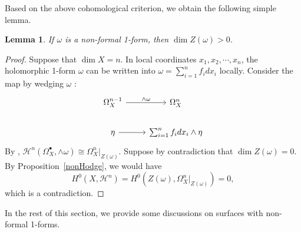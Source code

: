 \documentclass[a4paper,12pt,reqno]{amsart}
\newtheorem{lemma}[theorem]{Lemma}
\theoremstyle{question}
\theoremstyle{definition}
\theoremstyle{remark}
\theoremstyle{cited}
\theoremstyle{citeddef}
\def\cH{\mathcal{H}}
\begin{document}
Based on the above cohomological criterion, we obtain the following simple lemma.
\begin{lemma}\label{lem:positivedim}
    If $\omega$ is a non-formal 1-form, then $\dim Z(\omega)>0$.
\end{lemma}
\begin{proof}
     Suppose that $\dim X=n$. In local coordinates $x_1,x_2,\cdots,x_n$, the holomorphic 1-form $\omega$ can be written into $\omega=\sum_{i=1}^{n}f_idx_i$ locally. Consider the map by wedging $\omega$ :
$$
\begin{tikzcd}
\Omega_{X}^{n-1} \arrow[r,"\wedge \omega"] & \Omega_{X}^{n} \\
\eta \arrow[r]                 & \sum_{i=1}^{n}f_idx_i\wedge\eta
\end{tikzcd}
$$
By \cite[Lemma~4.2]{Sch21}, $\cH^n(\Omega_X^{\bullet},\wedge\omega)\cong \Omega_X^n|_{Z(\omega)}$. Suppose by contradiction that $\dim Z(\omega)=0$. By Proposition~\ref{nonHodge}, we would have 
$$
H^0(X, \cH^n)=H^0(Z(\omega), \Omega_X^n|_{Z(\omega)})=0,
$$
which is a contradiction.
\end{proof}
 

In the rest of this section, we provide some discussions on surfaces with non-formal 1-forms. 
\end{document}
